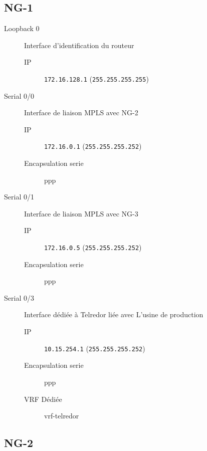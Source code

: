 \subsection{NG-1}

	\begin{description}
		\item[Loopback 0] Interface d'identification du routeur
		\begin{description}
			\item[IP] \texttt{172.16.128.1} (\texttt{255.255.255.255})
		\end{description}

		\item[Serial 0/0] Interface de liaison MPLS avec NG-2
		\begin{description}
			\item[IP] \texttt{172.16.0.1} (\texttt{255.255.255.252})
			\item[Encapsulation serie] ppp
		\end{description}

		\item[Serial 0/1] Interface de liaison MPLS avec NG-3
		\begin{description}
			\item[IP] \texttt{172.16.0.5} (\texttt{255.255.255.252})
			\item[Encapsulation serie] ppp
		\end{description}

		\item[Serial 0/3] Interface dédiée à Telredor liée avec L'usine de production
		\begin{description}
			\item[IP] \texttt{10.15.254.1} (\texttt{255.255.255.252})
			\item[Encapsulation serie] ppp
			\item[VRF Dédiée] vrf-telredor
		\end{description}

	\end{description}
	
	\clearpage
\subsection{NG-2}


